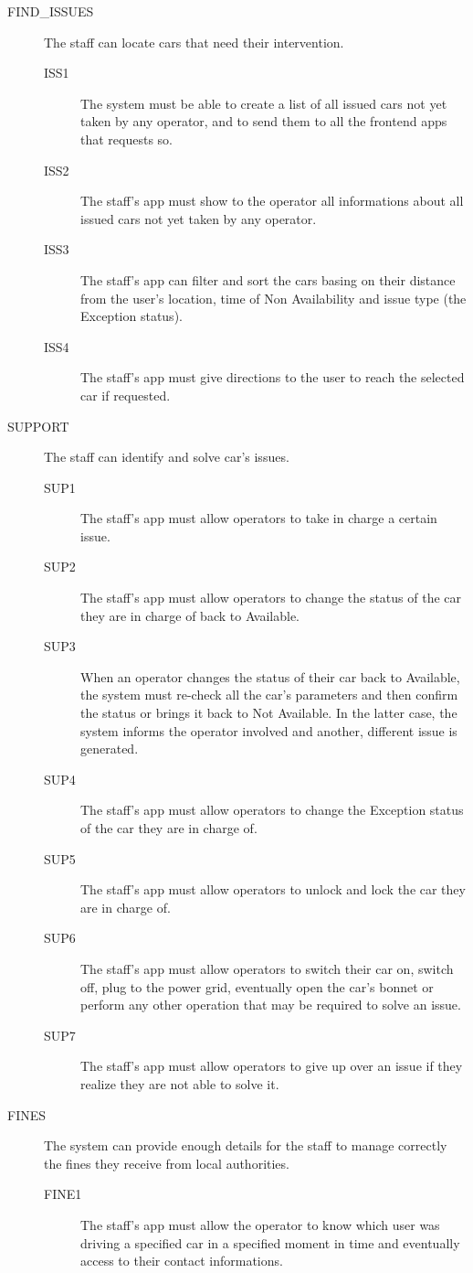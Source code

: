 \documentclass[11pt]{article} %
\begin{document}
\begin{description}
	\item[FIND\_ISSUES] The staff can locate cars that need their intervention.
	\begin{description}
	\item[ISS1] The system must be able to create a list of all issued cars not yet taken by any operator, and to send them to all the frontend apps that requests so.
	\item[ISS2] The staff's app must show to the operator all informations about all issued cars not yet taken by any operator.
	\item[ISS3] The staff's app can filter and sort the cars basing on their distance from the user's location, time of Non Availability and issue type (the Exception status).
	\item[ISS4] The staff's app must give directions to the user to reach the selected car if requested.
	\end{description}

	\item[SUPPORT] The staff can identify and solve car's issues.
	\begin{description}
	\item[SUP1] The staff's app must allow operators to take in charge a certain issue.
	\item[SUP2] The staff's app must allow operators to change the status of the car they are in charge of back to Available.
	\item[SUP3] When an operator changes the status of their car back to Available, the system must re-check all the car's parameters and then confirm the status or brings it back to Not Available. In the latter case, the system informs the operator involved and another, different issue is generated.
	\item[SUP4] The staff's app must allow operators to change the Exception status of the car they are in charge of.	
	\item[SUP5] The staff's app must allow operators to unlock and lock the car they are in charge of.
	\item[SUP6] The staff's app must allow operators to switch their car on, switch off, plug to the power grid, eventually open the car's bonnet or perform any other operation that may be required to solve an issue.
	\item[SUP7] The staff's app must allow operators to give up over an issue if they realize they are not able to solve it.
	\end{description}

	\item[FINES] The system can provide enough details for the staff to manage correctly the fines they receive from local authorities.
	\begin{description}
	\item[FINE1] The staff's app must allow the operator to know which user was driving a specified car in a specified moment in time and eventually access to their contact informations.
	\end{description}
\end{description}
\end{document}
